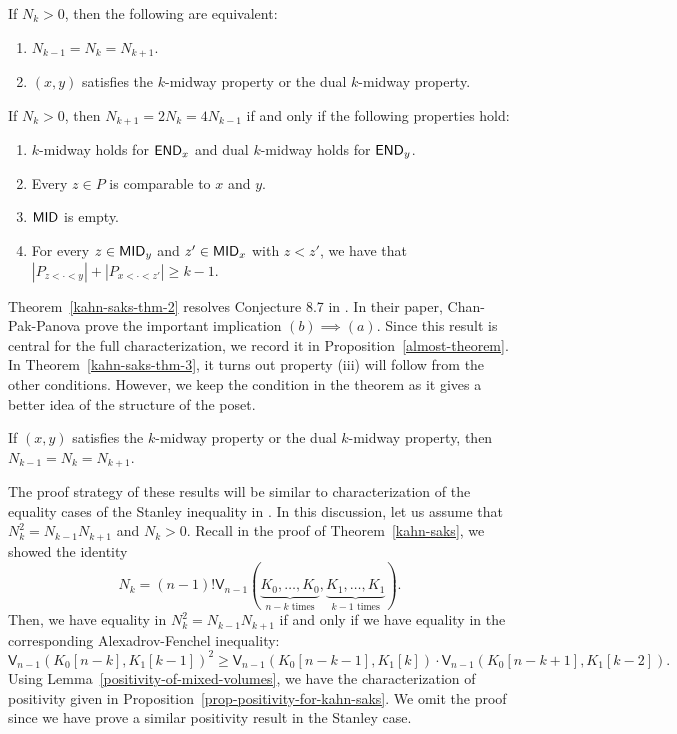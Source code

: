 \documentclass{puthesis-UG}
\begin{document}
\begin{thm} \label{kahn-saks-thm-2}
	If $N_k > 0$, then the following are equivalent:
	\begin{enumerate}[label = (\alph*)]
		\item $N_{k-1} = N_k = N_{k+1}$.
		\item $(x, y)$ satisfies the $k$-midway property or the dual $k$-midway property. 
	\end{enumerate}
\end{thm}

\begin{thm} \label{kahn-saks-thm-3}
	If $N_k > 0$, then $N_{k+1} = 2N_k = 4N_{k-1}$ if and only if the following properties hold: 
	\begin{enumerate}[label = (\roman*)]
		\item $k$-midway holds for $\mathsf{END}_x$ and dual $k$-midway holds for $\mathsf{END}_y$.  
		\item Every $z \in P$ is comparable to $x$ and $y$. 
		\item $\mathsf{MID}$ is empty. 
		\item For every $z \in \mathsf{MID}_y$ and $z' \in \mathsf{MID}_x$ with $z < z'$, we have that $|P_{z < \cdot < y}| + |P_{x < \cdot < z'}| \geq k-1$. 
	\end{enumerate}
\end{thm}

\begin{remark}
	Theorem~\ref{kahn-saks-thm-2} resolves Conjecture 8.7 in \cite{chan2022extensions}. In their paper, Chan-Pak-Panova prove the important implication $(b) \implies (a)$. Since this result is central for the full characterization, we record it in Proposition~\ref{almost-theorem}. In Theorem~\ref{kahn-saks-thm-3}, it turns out property (iii) will follow from the other conditions. However, we keep the condition in the theorem as it gives a better idea of the structure of the poset. 
\end{remark}

\begin{prop} \label{almost-theorem}
	If $(x, y)$ satisfies the $k$-midway property or the dual $k$-midway property, then $N_{k-1} = N_k = N_{k+1}$. 
\end{prop}

The proof strategy of these results will be similar to characterization of the equality cases of the Stanley inequality in \cite{shenfeld2022extremals}. In this discussion, let us assume that $N_k^2 = N_{k-1} N_{k+1}$ and $N_k > 0$. Recall in the proof of Theorem~\ref{kahn-saks}, we showed the identity 
\[
	N_k = (n-1)! \mathsf{V}_{n-1} \left ( \underbrace{K_0, \ldots, K_0}_{n-k \text{ times}}, \underbrace{K_1, \ldots, K_1}_{k-1 \text{ times}} \right ).
\]
Then, we have equality in $N_k^2 = N_{k-1} N_{k+1}$ if and only if we have equality in the corresponding Alexadrov-Fenchel inequality:
\[
	\mathsf{V}_{n-1}(K_0[n-k], K_1[k-1])^2 \geq \mathsf{V}_{n-1} (K_0[n-k-1], K_1[k]) \cdot \mathsf{V}_{n-1} (K_0[n-k+1], K_1[k-2]).
\]
Using Lemma~\ref{positivity-of-mixed-volumes}, we have the characterization of positivity given in Proposition~\ref{prop-positivity-for-kahn-saks}. We omit the proof since we have prove a similar positivity result in the Stanley case. 
\end{document}
